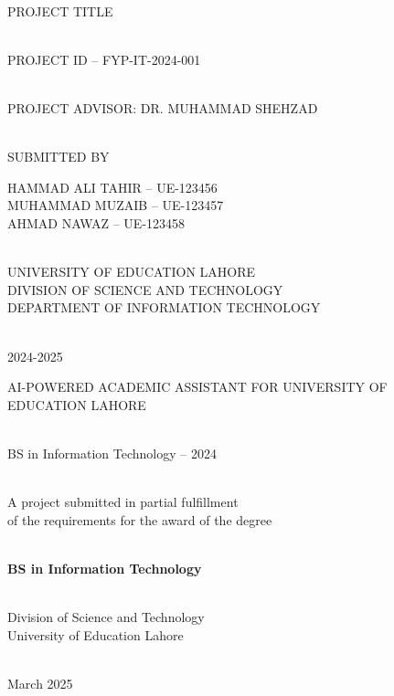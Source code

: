 \documentclass[12pt,a4paper]{book}
\numberwithin{table}{chapter}
\numberwithin{figure}{chapter}
\numberwithin{equation}{chapter}
\begin{document}

\thispagestyle{empty}
\strut\vfill
\begin{center}
\fontsize{16}{12}\bfseries\selectfont

~\\[3\baselineskip]
PROJECT TITLE

~\\[5\baselineskip]
PROJECT ID – FYP-IT-2024-001

~\\[4\baselineskip]
PROJECT ADVISOR: DR. MUHAMMAD SHEHZAD

~\\[2\baselineskip]
SUBMITTED BY

HAMMAD ALI TAHIR – UE-123456\\
MUHAMMAD MUZAIB – UE-123457\\
AHMAD NAWAZ – UE-123458

~\\[4\baselineskip]
UNIVERSITY OF EDUCATION LAHORE\\
DIVISION OF SCIENCE AND TECHNOLOGY\\
DEPARTMENT OF INFORMATION TECHNOLOGY

~\\[2\baselineskip]
2024-2025

\end{center}
\vfill\strut
\clearpage

\thispagestyle{empty}
\strut\vfill
\begin{center}
\fontsize{14}{12}\bfseries\selectfont

AI-POWERED ACADEMIC ASSISTANT FOR UNIVERSITY OF EDUCATION LAHORE

~\\[2\baselineskip]
BS in Information Technology – 2024

~\\[4\baselineskip]
\normalfont\normalsize
A project submitted in partial fulfillment\\
of the requirements for the award of the degree

~\\[2\baselineskip]
\bfseries BS in Information Technology

~\\[6\baselineskip]
\normalfont\normalsize
Division of Science and Technology\\
University of Education Lahore

~\\[2\baselineskip]
March 2025

\end{center}
\vfill\strut
\clearpage
\end{document}
